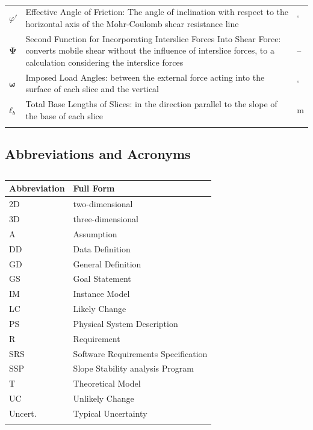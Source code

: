 \documentclass[12pt]{article}
\begin{document}
\begin{longtabu}{l X[l] l}
\\
$φ'$ & Effective Angle of Friction: The angle of inclination with respect to the horizontal axis of the Mohr-Coulomb shear resistance line & ${}^{\circ}$
\\
$\mathbf{Ψ}$ & Second Function for Incorporating Interslice Forces Into Shear Force: converts mobile shear without the influence of interslice forces, to a calculation considering the interslice forces & --
\\
$\mathbf{ω}$ & Imposed Load Angles: between the external force acting into the surface of each slice and the vertical & ${}^{\circ}$
\\
${\mathbf{ℓ}_{b}}$ & Total Base Lengths of Slices: in the direction parallel to the slope of the base of each slice & m
\\
\bottomrule
\caption{}
\label{Table:ToS}
\end{longtabu}
\subsection{Abbreviations and Acronyms}
\label{Sec:TAbbAcc}
\begin{longtable}{l l}
\toprule
Abbreviation & Full Form
\\
\midrule
\endhead
2D & two-dimensional
\\
3D & three-dimensional
\\
A & Assumption
\\
DD & Data Definition
\\
GD & General Definition
\\
GS & Goal Statement
\\
IM & Instance Model
\\
LC & Likely Change
\\
PS & Physical System Description
\\
R & Requirement
\\
SRS & Software Requirements Specification
\\
SSP & Slope Stability analysis Program
\\
T & Theoretical Model
\\
UC & Unlikely Change
\\
Uncert. & Typical Uncertainty
\\
\bottomrule
\caption{}
\label{Table:TAbbAcc}
\end{longtable}
\end{document}
